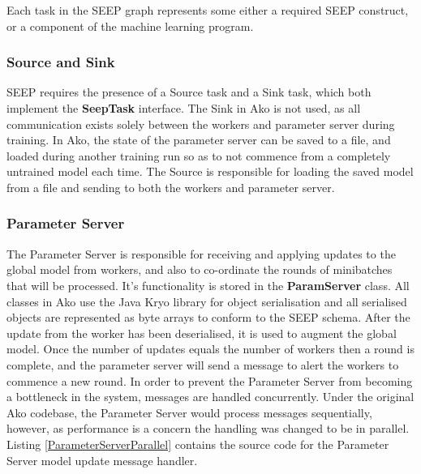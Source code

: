 \documentclass[12pt]{article}
\begin{document}
Each task in the SEEP graph represents some either a required SEEP construct, or a component of the machine learning program.

\subsubsection{Source and Sink}

SEEP requires the presence of a Source task and a Sink task, which both implement the \textbf{SeepTask} interface. The Sink in Ako is not used, as all communication exists solely between the workers and parameter server during training.
\newline
\newline
In Ako, the state of the parameter server can be saved to a file, and loaded during another training run so as to not commence from a completely untrained model each time. The Source is responsible for loading the saved model from a file and sending to both the workers and parameter server.

\subsubsection{Parameter Server}

The Parameter Server is responsible for receiving and applying updates to the global model from workers, and also to co-ordinate the rounds of minibatches that will be processed. It's functionality is stored in the \textbf{ParamServer} class.
\newline
\newline
All classes in Ako use the Java Kryo library \cite{kryo} for object serialisation and all serialised objects are represented as byte arrays to conform to the SEEP schema. After the update from the worker has been deserialised, it is used to augment the global model. Once the number of updates equals the number of workers then a round is complete, and the parameter server will send a message to alert the workers to commence a new round.
\newline
\newline
In order to prevent the Parameter Server from becoming a bottleneck in the system, messages are handled concurrently. Under the original Ako codebase, the Parameter Server would process messages sequentially, however, as performance is a concern the handling was changed to be in parallel. Listing \ref{ParameterServerParallel} contains the source code for the Parameter Server model update message handler.
\end{document}
